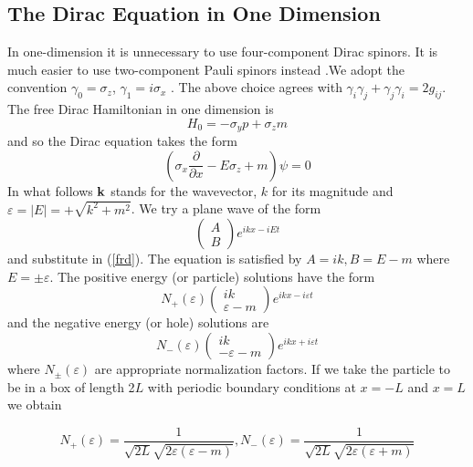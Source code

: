\subsection{The Dirac Equation in One Dimension}

\noindent In one-dimension it is unnecessary to use four-component Dirac
spinors. It is much easier to use two-component Pauli spinors instead \cite
{bruce}.We adopt the convention $\gamma _0=\sigma _z$, $\gamma _1=i\sigma _x$%
. The above choice agrees with $\gamma _i\gamma _j+\gamma _j\gamma
_i=2g_{ij}.$ The free Dirac Hamiltonian in one dimension is 
\[
H_0=-\sigma _yp+\sigma _zm 
\]
and so the Dirac equation takes the form 
\begin{equation}
(\sigma _x\frac \partial {\partial x}-E\sigma _z+m)\psi =0  \label{frd}
\end{equation}
In what follows ${\bf k}$ stands for the wavevector, $k$ for its magnitude
and $\varepsilon =\left| E\right| =+\sqrt{k^2+m^2}$. We try a plane wave of
the form 
\begin{equation}
\left( 
\begin{array}{c}
A \\ 
B
\end{array}
\right) e^{ikx-iEt}  \label{frs}
\end{equation}
and substitute in (\ref{frd}). The equation is satisfied by $A=ik,B=E-m$
where $E=\pm \varepsilon $. The positive energy (or particle) solutions have
the form 
\begin{equation}
N_{+}(\varepsilon )\left( 
\begin{array}{c}
ik \\ 
\varepsilon -m
\end{array}
\right) e^{ikx-i\varepsilon t}  \label{frp}
\end{equation}
and the negative energy (or hole) solutions are 
\begin{equation}
N_{-}(\varepsilon )\left( 
\begin{array}{c}
ik \\ 
-\varepsilon -m
\end{array}
\right) e^{ikx+i\varepsilon t}  \label{frn}
\end{equation}
where $N_{\pm }(\varepsilon )$ are appropriate normalization factors. If we
take the particle to be in a box of length 2$L$ with periodic boundary
conditions at $x=-L$ and $x=L$ we obtain

\begin{equation}
N_{+}(\varepsilon )=\frac 1{\sqrt{2L}\sqrt{2\varepsilon (\varepsilon -m)}}%
,N_{-}(\varepsilon )=\frac 1{\sqrt{2L}\sqrt{2\varepsilon (\varepsilon +m)}}
\label{norm}
\end{equation}

